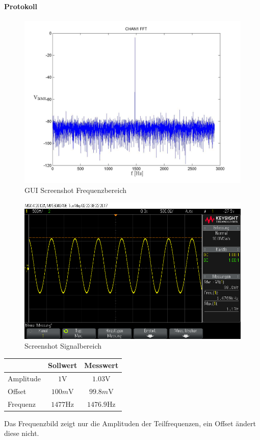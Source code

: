 \documentclass[10pt]{scrreprt}
\begin{document}
        \paragraph{Protokoll}
        \begin{center}
            \begin{figure}[H]
                \includegraphics[width=\textwidth]{Screenshot_GUI_4131_FFT_chan1_fft.jpg}
              \caption{GUI Screenshot Frequenzbereich}
            \end{figure}
            \begin{figure}[H]
                \includegraphics[width=\textwidth]{Screenshot_GUI_4131_Zeit_werte.png}
              \caption{Screenshot  Signalbereich}
            \end{figure}
            \begin{tabular}{lcc}
                \toprule
                & Sollwert & Messwert\\
                \midrule
                Amplitude & $1\si{\volt}$ & $1.03\si{\volt}$\\
                Offset & $100\si{m\volt}$ & $99.8\si{m\volt}$\\
                Frequenz & $1477\si{\hertz}$ & $1476.9\si{\hertz}$\\
                \bottomrule
            \end{tabular}
        \end{center}
        Das Frequenzbild zeigt nur die Amplituden der Teilfrequenzen, ein Offset
        ändert diese nicht.
\end{document}
